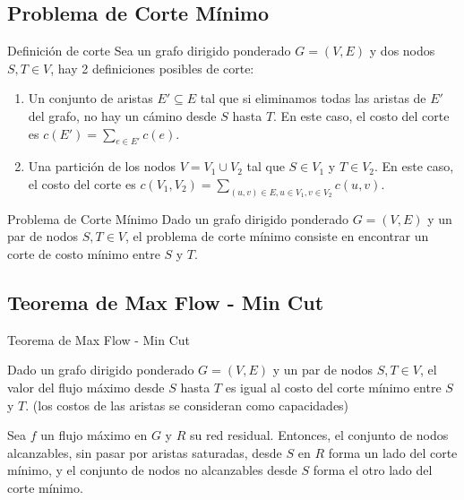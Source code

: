 \documentclass{beamer}
\begin{document}
\subsection{Problema de Corte Mínimo}
\begin{frame}{Definición de corte}
    Sea un grafo dirigido ponderado $G = (V, E)$ y dos nodos $S, T \in V$, hay 2 definiciones posibles de corte:
    \begin{enumerate}
        \item Un conjunto de aristas $E' \subseteq E$ tal que si eliminamos todas las aristas de $E'$ del grafo, no hay un cámino desde $S$ hasta $T$. En este caso, el costo del corte es $c(E') = \sum_{e \in E'} c(e)$.
        \item Una partición de los nodos $V = V_1 \cup V_2$ tal que $S \in V_1$ y $T \in V_2$. En este caso, el costo del corte es $c(V_1, V_2) = \sum_{(u,v) \in E, u \in V_1, v \in V_2} c(u,v)$.
    \end{enumerate}
\end{frame}

\begin{frame}{Problema de Corte Mínimo}
    Dado un grafo dirigido ponderado $G = (V,E)$ y un par de nodos $S, T \in V$, el problema de corte mínimo consiste en encontrar un corte de costo mínimo entre $S$ y $T$.    
\end{frame}

\subsection{Teorema de Max Flow - Min Cut}

\begin{frame}{Teorema de Max Flow - Min Cut}
    \begin{Theorem}
        Dado un grafo dirigido ponderado $G = (V,E)$ y un par de nodos $S, T \in V$, el valor del flujo máximo desde $S$ hasta $T$ es igual al costo del corte mínimo entre $S$ y $T$.
        (los costos de las aristas se consideran como capacidades)
    \end{Theorem}
    
    \pause

    \begin{Theorem}
        Sea $f$ un flujo máximo en $G$ y $R$ su red residual. Entonces, el conjunto de nodos alcanzables, sin pasar por aristas saturadas, desde $S$ en $R$ forma un lado del corte mínimo, y el conjunto de nodos no alcanzables desde $S$ forma el otro lado del corte mínimo.

    \end{Theorem}
\end{frame}
\end{document}
